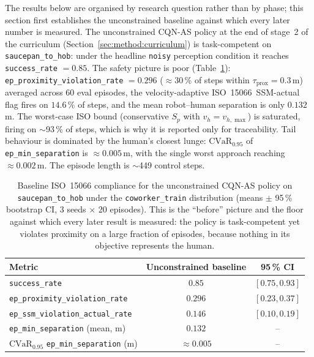 \documentclass[11pt,a4paper]{report}
\newcommand{\ssm}{SSM}
\newcommand{\iso}{ISO~15066}
\newcommand{\cvar}{\ensuremath{\mathrm{CVaR}}}
\newcommand{\cqnas}{CQN-AS}
\begin{document}
The results below are organised by research question rather than by
phase; this section first establishes the unconstrained baseline
against which every later number is measured. The unconstrained
\cqnas{} policy at the end of stage~2 of the
curriculum (Section~\ref{sec:method:curriculum}) is task-competent
on \texttt{saucepan\_to\_hob}: under the headline \texttt{noisy}
perception condition it reaches \texttt{success\_rate} $= 0.85$.
The safety picture is poor (Table~\ref{tab:results:baseline}):
\texttt{ep\_proximity\_violation\_rate} $= 0.296$ ($\approx$30\,\% of steps within $\tau_{\mathrm{prox}} =
0.3$\,m) averaged across 60 eval episodes, the velocity-adaptive
\iso{}~\ssm{}-actual flag fires on $14.6\,\%$ of steps, and the mean
robot--human separation is only $0.132$\,m. The worst-case ISO bound
(conservative $S_p$ with $v_h = v_{h,\max}$) is saturated, firing on
$\sim$93\,\% of steps, which is why it is reported only for
traceability. Tail behaviour is dominated by the human's closest
lunge: $\cvar_{0.95}$ of \texttt{ep\_min\_separation} is
$\approx 0.005$\,m, with the single worst approach reaching
$\approx 0.002$\,m. The episode length is $\sim$449 control steps.

\begin{table}[htbp]
\centering
\caption{Baseline \iso{} compliance for the unconstrained
\cqnas{} policy on \texttt{saucepan\_to\_hob} under the
\texttt{coworker\_train} distribution (means $\pm$ 95\,\% bootstrap
CI, 3 seeds $\times$ 20 episodes). This is the ``before'' picture and
the floor against which every later result is measured: the policy is
task-competent yet violates proximity on a large fraction of
episodes, because nothing in its objective represents the human.}
\label{tab:results:baseline}
\small
\begin{tabular}{lcc}
\toprule
Metric & Unconstrained baseline & 95\,\% CI \\
\midrule
\texttt{success\_rate}                          & $0.85$  & $[0.75, 0.93]$ \\
\texttt{ep\_proximity\_violation\_rate}         & $0.296$ & $[0.23, 0.37]$ \\
\texttt{ep\_ssm\_violation\_actual\_rate}       & $0.146$ & $[0.10, 0.19]$ \\
\texttt{ep\_min\_separation} (mean, m)          & $0.132$ & -- \\
$\cvar_{0.95}$ \texttt{ep\_min\_separation} (m) & $\approx 0.005$ & -- \\
\bottomrule
\end{tabular}
\end{table}
\end{document}
